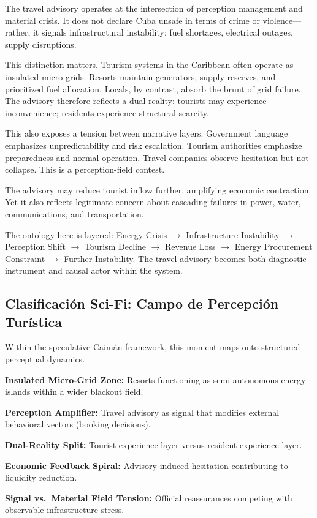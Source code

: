 \documentclass[12pt]{article}
\begin{document}
The travel advisory operates at the intersection of perception management and material crisis. It does not declare Cuba unsafe in terms of crime or violence---rather, it signals infrastructural instability: fuel shortages, electrical outages, supply disruptions.

This distinction matters. Tourism systems in the Caribbean often operate as insulated micro-grids. Resorts maintain generators, supply reserves, and prioritized fuel allocation. Locals, by contrast, absorb the brunt of grid failure. The advisory therefore reflects a dual reality: tourists may experience inconvenience; residents experience structural scarcity.

This also exposes a tension between narrative layers. Government language emphasizes unpredictability and risk escalation. Tourism authorities emphasize preparedness and normal operation. Travel companies observe hesitation but not collapse. This is a perception-field contest.

The advisory may reduce tourist inflow further, amplifying economic contraction. Yet it also reflects legitimate concern about cascading failures in power, water, communications, and transportation.

The ontology here is layered: Energy Crisis $\to$ Infrastructure Instability $\to$ Perception Shift $\to$ Tourism Decline $\to$ Revenue Loss $\to$ Energy Procurement Constraint $\to$ Further Instability. The travel advisory becomes both diagnostic instrument and causal actor within the system.

\subsection*{Clasificación Sci-Fi: Campo de Percepción Turística}

Within the speculative Caimán framework, this moment maps onto structured perceptual dynamics.

\textbf{Insulated Micro-Grid Zone:} Resorts functioning as semi-autonomous energy islands within a wider blackout field.

\textbf{Perception Amplifier:} Travel advisory as signal that modifies external behavioral vectors (booking decisions).

\textbf{Dual-Reality Split:} Tourist-experience layer versus resident-experience layer.

\textbf{Economic Feedback Spiral:} Advisory-induced hesitation contributing to liquidity reduction.

\textbf{Signal vs.\ Material Field Tension:} Official reassurances competing with observable infrastructure stress.
\end{document}
